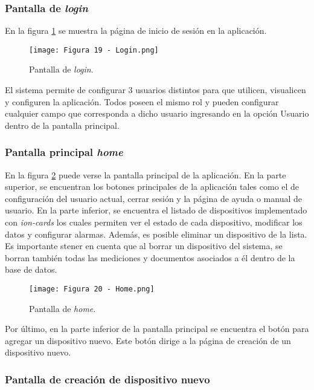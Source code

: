 \subsubsection{Pantalla de \textit{login}}

En la figura \ref{fig:19} se muestra la página de inicio de sesión en la aplicación.

\begin{figure}[h]
\centering
\texttt{[image: Figura 19 - Login.png]}
\caption[Pantalla login]{Pantalla de \textit{login}. \footnotemark}
\label{fig:19}
\end{figure}

El sistema permite de configurar 3 usuarios distintos para que utilicen, visualicen y configuren la aplicación. Todos poseen el mismo rol y pueden configurar cualquier campo que corresponda a dicho usuario ingresando en la opción Usuario dentro de la pantalla principal.

\subsubsection{Pantalla principal \textit{home}}

En la figura \ref{fig:20} puede verse la pantalla principal de la aplicación. En la parte superior, se encuentran los botones principales de la aplicación tales como el de configuración del usuario actual, cerrar sesión y la página de ayuda o manual de usuario. En la parte inferior, se encuentra el listado de dispositivos implementado con \textit{ion-cards} los cuales permiten ver el estado de cada dispositivo, modificar los datos y configurar alarmas. Además, es posible eliminar un dispositivo de la lista. Es importante stener en cuenta que al borrar un dispositivo del sistema, se borran también todas las mediciones y documentos asociados a él dentro de la base de datos.

\begin{figure}[h]
\centering
\texttt{[image: Figura 20 - Home.png]}
\caption[Pantalla home]{Pantalla de \textit{home}. \footnotemark}
\label{fig:20}
\end{figure}

Por último, en la parte inferior de la pantalla principal se encuentra el botón para agregar un dispositivo nuevo. Este botón dirige a la página de creación de un dispositivo nuevo.

\subsubsection{Pantalla de creación de dispositivo nuevo}

